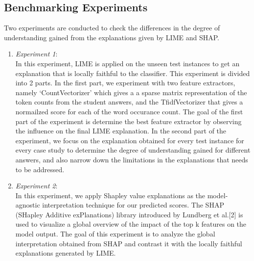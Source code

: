 \documentclass[letterpaper, 10 pt, conference]{ieeeconf}  %
\begin{document}
\subsection{Benchmarking Experiments}
Two experiments are conducted to check the differences in the degree of understanding gained from the explanations given by LIME and SHAP.
\begin{enumerate}
\item \textit{Experiment 1}:\\
In this experiment, LIME is applied on the unseen test instances  to get an explanation that is locally faithful to the classifier. This experiment is divided into 2 parts. In the first part, we experiment with two feature extractors, namely `CountVectorizer' which gives a a sparse matrix representation of the token counts from the student answers, and the TfidfVectorizer that gives a normailzed score for each of the word occurance count. The goal of the first part of the experiment is determine the best feature extractor by observing the influence  on the final LIME explanation. In the second part of the experiment, we focus on the explanation obtained for every test instance for every case study to determine the degree of understanding gained for different answers, and also narrow down the limitations in the explanations that needs to be addressed.
\item \textit{Experiment 2}:\\
In this experiment, we apply Shapley value explanations as the model-agnostic interpretation technique for our predicted scores. The SHAP (SHapley Additive exPlanations) library
introduced by Lundberg et al.[2] is used to visualize a global overview of the impact of the top k features on the model output. The goal of this experiment is to analyze the global interpretation obtained from SHAP and contrast it with the locally faithful explanations generated by LIME.
\end{enumerate}
\end{document}
